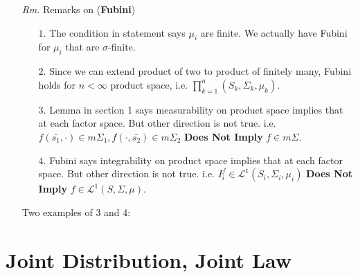 \documentclass[a4paper,12pt,twoside]{book}
\begin{document}
\begin{itemize}
	\item[\textit{Rm.}] Remarks on (\textbf{Fubini})
	\begin{itemize}
		\item[$1.$] The condition in statement says $\mu_i$ are finite. We actually have Fubini for $\mu_i$ that are $\sigma$-finite.
		\item[$2.$] Since we can extend product of two to product of finitely many, Fubini holds for $n<\infty$ product space, i.e. $\prod_{k=1}^n (S_k, \Sigma_k, \mu_k)$. 
		\item[$3.$] Lemma in section 1 says measurability on product space implies that at each factor space. But other direction is not true. i.e. $f(\bar{s_1}, \cdot)\in m\Sigma_1,f(\cdot, \bar{s_2})\in m\Sigma_2$ \textbf{Does Not Imply} $f\in m\Sigma$.
		\item[$4.$] Fubini says integrability on product space implies that at each factor space. But other direction is not true. i.e. $I^f_i\in \mathcal{L}^1(S_i, \Sigma_i, \mu_i)$ \textbf{Does Not Imply} $f\in \mathcal{L}^1(S, \Sigma,\mu)$.
	\end{itemize}
	Two examples of 3 and 4:

\end{itemize}

\section{Joint Distribution, Joint Law}
\end{document}
